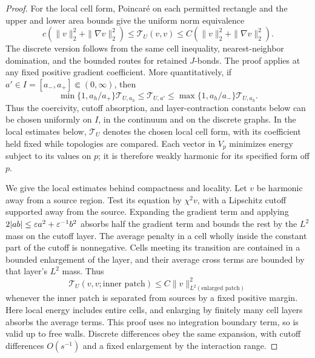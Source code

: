 \begin{proof}
For the local cell form, Poincar\'e on each permitted rectangle and
the upper and lower area bounds give the uniform norm equivalence
\begin{equation}
 c\left(\|v\|_2^2+\|\nabla v\|_2^2\right)
 \le\mathcal T_U(v,v)
 \le C\left(\|v\|_2^2+\|\nabla v\|_2^2\right).
 \label{an:high-coercivity}
\end{equation}
The discrete version follows from the same cell
inequality, nearest-neighbor domination, and the
bounded routes for retained $J$-bonds.  The proof applies at any
fixed positive gradient coefficient.  More quantitatively, if
$a'\in I=[a_-,a_+]\Subset(0,\infty)$, then
\[
 \min\{1,a_h/a_+\}\mathcal T_{U,a_h}
 \le\mathcal T_{U,a'}\le
 \max\{1,a_h/a_-\}\mathcal T_{U,a_h}.
\]
Thus the coercivity, cutoff absorption, and layer-contraction
constants below can be chosen uniformly on $I$, in the continuum
and on the discrete graphs.  In the local estimates below,
$\mathcal T_U$ denotes the chosen local cell form, with its coefficient
held fixed while topologies are compared.  Each vector in
$V_p$ minimizes energy subject to its values on $p$;
it is therefore weakly harmonic for its specified form off $p$.

We give the local estimates behind compactness and
locality.  Let $v$ be harmonic away from a source
region.  Test its equation by $\chi^2v$, with a
Lipschitz cutoff supported away from the source.
Expanding the gradient term and applying
$2|ab|\le\varepsilon a^2+\varepsilon^{-1}b^2$ absorbs half the
gradient term and bounds the rest by the $L^2$
mass on the cutoff layer.  The average penalty in
a cell wholly inside the constant part of the
cutoff is nonnegative.  Cells meeting its
transition are contained in a bounded enlargement
of the layer, and their average cross terms are
bounded by that layer's $L^2$ mass.  Thus
\[
 \mathcal T_U(v,v;\text{inner patch})
        \le C\|v\|_{L^2(\text{enlarged patch})}^2
\]
whenever the inner patch is separated from sources
by a fixed positive margin.  Here local energy
includes entire cells, and enlarging by finitely
many cell layers absorbs the average terms.
This proof uses no integration boundary term, so
is valid up to free walls.  Discrete differences
obey the same expansion, with cutoff differences
$O(s^{-1})$ and a fixed enlargement by the
interaction range.


\end{proof}
